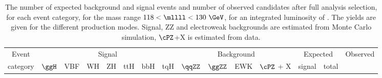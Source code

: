 \begin{table}[htb]
	\begin{center}
		\small
		\caption{The number of expected background and signal events and number of observed candidates after full analysis selection, for each event category, for the mass range $118<\mllll<130~\GeV$, for an integrated luminosity of \usedLumiC.
			The yields are given for the different production modes.
			Signal, ZZ and electroweak backgrounds are estimated from Monte Carlo simulation, 
			$\cPZ$+X is estimated from data.
			\label{tab:EventYieldsPeakCategC}}
		\resizebox{\textwidth}{!}
		{
				\begin{tabular}{cccccccc|cccc|cc|c}
				\hline
				\hline
				Event & \multicolumn{7}{c|}{Signal} & \multicolumn{4}{c|}{Background} &  \multicolumn{2}{c|}{Expected} & Observed \\
				category             & $\ggH$ &VBF    &WH    &ZH    &ttH   &bbH   &tqH   &$\qqZZ$  &$\ggZZ$  & EWK & $\cPZ$ + X & signal&total& \\
				\hline
				

\end{tabular}}
\end{center}
\end{table}
